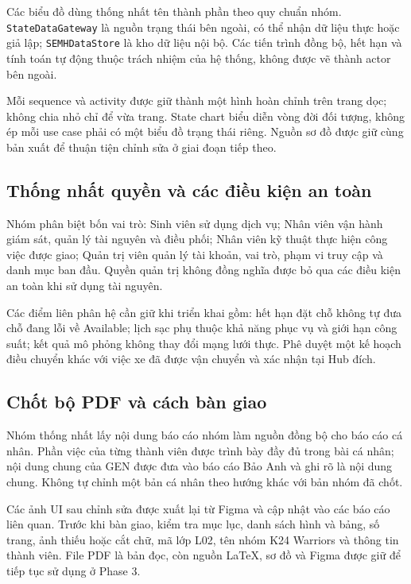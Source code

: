 \documentclass[10pt,a4paper]{article}
\begin{document}
Các biểu đồ dùng thống nhất tên thành phần theo quy chuẩn nhóm. \texttt{StateDataGateway} là nguồn trạng thái bên ngoài, có thể nhận dữ liệu thực hoặc giả lập; \texttt{SEMHDataStore} là kho dữ liệu nội bộ. Các tiến trình đồng bộ, hết hạn và tính toán tự động thuộc trách nhiệm của hệ thống, không được vẽ thành actor bên ngoài.

Mỗi sequence và activity được giữ thành một hình hoàn chỉnh trên trang dọc; không chia nhỏ chỉ để vừa trang. State chart biểu diễn vòng đời đối tượng, không ép mỗi use case phải có một biểu đồ trạng thái riêng. Nguồn sơ đồ được giữ cùng bản xuất để thuận tiện chỉnh sửa ở giai đoạn tiếp theo.

\subsection{Thống nhất quyền và các điều kiện an toàn}
Nhóm phân biệt bốn vai trò: Sinh viên sử dụng dịch vụ; Nhân viên vận hành giám sát, quản lý tài nguyên và điều phối; Nhân viên kỹ thuật thực hiện công việc được giao; Quản trị viên quản lý tài khoản, vai trò, phạm vi truy cập và danh mục ban đầu. Quyền quản trị không đồng nghĩa được bỏ qua các điều kiện an toàn khi sử dụng tài nguyên.

Các điểm liên phân hệ cần giữ khi triển khai gồm: hết hạn đặt chỗ không tự đưa chỗ đang lỗi về Available; lịch sạc phụ thuộc khả năng phục vụ và giới hạn công suất; kết quả mô phỏng không thay đổi mạng lưới thực. Phê duyệt một kế hoạch điều chuyển khác với việc xe đã được vận chuyển và xác nhận tại Hub đích.

\subsection{Chốt bộ PDF và cách bàn giao}
Nhóm thống nhất lấy nội dung báo cáo nhóm làm nguồn đồng bộ cho báo cáo cá nhân. Phần việc của từng thành viên được trình bày đầy đủ trong bài cá nhân; nội dung chung của GEN được đưa vào báo cáo Bảo Anh và ghi rõ là nội dung chung. Không tự chỉnh một bản cá nhân theo hướng khác với bản nhóm đã chốt.

Các ảnh UI sau chỉnh sửa được xuất lại từ Figma và cập nhật vào các báo cáo liên quan. Trước khi bàn giao, kiểm tra mục lục, danh sách hình và bảng, số trang, ảnh thiếu hoặc cắt chữ, mã lớp L02, tên nhóm K24 Warriors và thông tin thành viên. File PDF là bản đọc, còn nguồn LaTeX, sơ đồ và Figma được giữ để tiếp tục sử dụng ở Phase 3.

\clearpage
\end{document}
